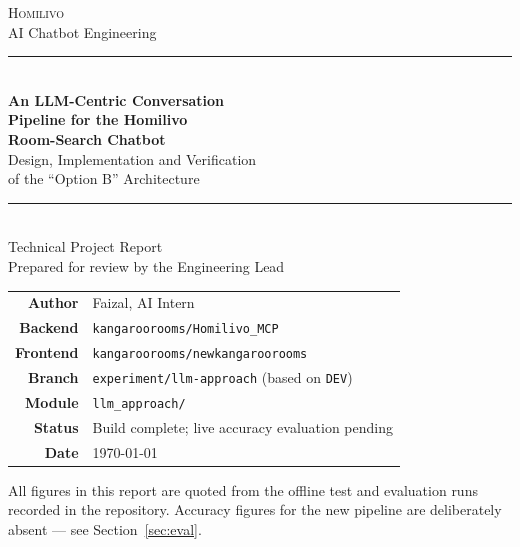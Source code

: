\documentclass[11pt,a4paper]{article}
\begin{document}
\begin{titlepage}
\centering
\vspace*{2.2cm}

{\Large\scshape Homilivo}\\[0.3cm]
{\large AI Chatbot Engineering}\\[2.2cm]

{\color{hvblue}\rule{\textwidth}{1.2pt}}\\[0.5cm]
{\Huge\bfseries An LLM-Centric Conversation\\[0.25cm] Pipeline for the Homilivo\\[0.25cm] Room-Search Chatbot}\\[0.6cm]
{\Large Design, Implementation and Verification\\ of the ``Option B'' Architecture}\\[0.4cm]
{\color{hvblue}\rule{\textwidth}{1.2pt}}\\[1.6cm]

{\large Technical Project Report}\\[0.4cm]
{\normalsize Prepared for review by the Engineering Lead}\\[2.2cm]

\begin{tabular}{rl}
\textbf{Author}      & Faizal, AI Intern\\[4pt]
\textbf{Backend}     & \texttt{kangaroorooms/Homilivo\_MCP}\\[4pt]
\textbf{Frontend}    & \texttt{kangaroorooms/newkangaroorooms}\\[4pt]
\textbf{Branch}      & \texttt{experiment/llm-approach} (based on \texttt{DEV})\\[4pt]
\textbf{Module}      & \texttt{llm\_approach/}\\[4pt]
\textbf{Status}      & Build complete; live accuracy evaluation pending\\[4pt]
\textbf{Date}        & \today\\
\end{tabular}

\vfill
{\footnotesize All figures in this report are quoted from the offline test and evaluation
runs recorded in the repository. Accuracy figures for the new pipeline are deliberately
absent --- see Section~\ref{sec:eval}.}
\end{titlepage}

\tableofcontents
\newpage

\end{document}
